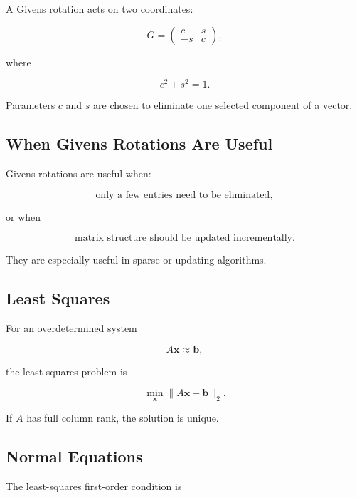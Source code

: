 A Givens rotation acts on two coordinates:

\[
\boxed{
G
=
\begin{pmatrix}
c&s\\
-s&c
\end{pmatrix},
}
\]

where

\[
\boxed{
c^2+s^2=1.
}
\]

Parameters \(c\) and \(s\) are chosen to eliminate one selected component
of a vector.

\subsection{When Givens Rotations Are Useful}
\label{subsec:givens-use}

Givens rotations are useful when:

\[
\boxed{
\text{only a few entries need to be eliminated},
}
\]

or when

\[
\boxed{
\text{matrix structure should be updated incrementally}.
}
\]

They are especially useful in sparse or updating algorithms.

\subsection{Least Squares}
\label{subsec:nla-least-squares}

For an overdetermined system

\[
A\mathbf{x}
\approx
\mathbf{b},
\]

the least-squares problem is

\[
\boxed{
\min_{\mathbf{x}}
\|A\mathbf{x}-\mathbf{b}\|_2.
}
\]

If \(A\) has full column rank, the solution is unique.

\subsection{Normal Equations}
\label{subsec:nla-normal-equations}

The least-squares first-order condition is

